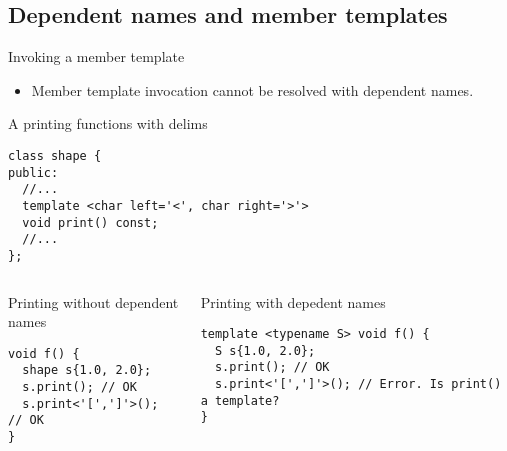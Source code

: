 \subsection{Dependent names and member templates}

\begin{frame}[t,fragile]{Invoking a member template}
\begin{itemize}
  \item Member template invocation cannot be resolved with dependent names.
\end{itemize}

\begin{block}{A printing functions with delims}
\begin{lstlisting}[basicstyle=\mode<presentation>{\tiny}]
class shape {
public:
  //...
  template <char left='<', char right='>'>
  void print() const;
  //...
};
\end{lstlisting}
\end{block}

\begin{columns}[T]

\begin{block}{Printing without dependent names}
\begin{lstlisting}
void f() {
  shape s{1.0, 2.0};
  s.print(); // OK
  s.print<'[',']'>(); // OK
}
\end{lstlisting}
\end{block}

\begin{block}{Printing with depedent names}
\begin{lstlisting}
template <typename S> void f() {
  S s{1.0, 2.0};
  s.print(); // OK
  s.print<'[',']'>(); // Error. Is print() a template?
}
\end{lstlisting}
\end{block}

\end{columns}
\end{frame}

